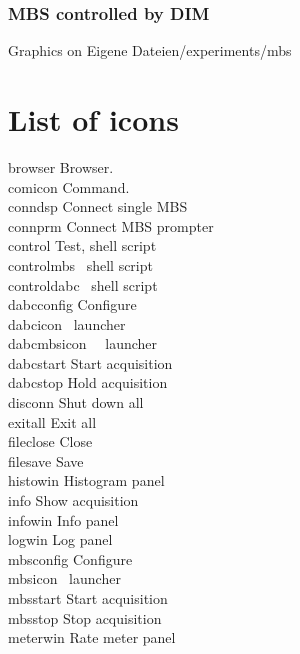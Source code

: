 \subsubsection{MBS controlled by DIM}
Graphics on Eigene Dateien/experiments/mbs
\section{List of icons}
 browser Browser.\\
 comicon Command.\\
 conndsp Connect single MBS\\
 connprm Connect MBS prompter\\
 control Test, shell script\\
 controlmbs \dabc\ shell script\\
 controldabc \mbs\ shell script\\
 dabcconfig Configure\\
 dabcicon \dabc\ launcher\\
 dabcmbsicon \dabc\ \mbs\ launcher\\
 dabcstart Start acquisition\\
 dabcstop Hold acquisition\\
 disconn Shut down all \\
 exitall Exit all\\
 fileclose Close\\
 filesave Save\\
 histowin Histogram panel\\
 info Show acquisition\\
 infowin Info panel\\
 logwin Log panel\\
 mbsconfig Configure\\
 mbsicon \mbs\ launcher\\
 mbsstart Start acquisition\\
 mbsstop Stop acquisition\\
 meterwin Rate meter panel\\

